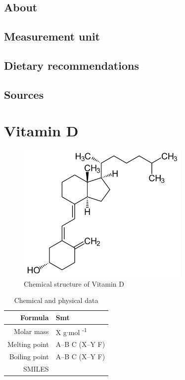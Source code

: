 \documentclass{book}
\begin{document}
\section{About}


\section{Measurement unit}


\section{Dietary recommendations}


\section{Sources}


\chapter{Vitamin D}
\begin{figure}[h]
	\caption{Chemical structure of Vitamin D}
	\centering \includegraphics[width=0.75\textwidth]{images/Vitamin_D_chemical_structure}
\end{figure}

\begin{table}[h]
	\caption{Chemical and physical data}
	\centering \begin{tabular}{| r | l |}
		\hline
		Formula & Smt\\ \hline
		Molar mass & X g$\cdot$mol \textsuperscript{-1}\\ \hline
		Melting point & A--B \degree C (X--Y \degree F)\\ \hline
		Boiling point & A--B \degree C (X--Y \degree F)\\ \hline
		SMILES & \\ \hline
	\end{tabular}
\end{table}
\newpage
\end{document}
